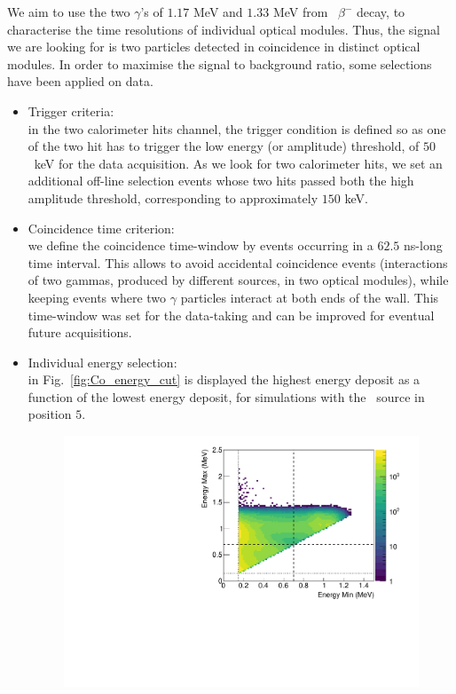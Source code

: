 We aim to use the two $\gamma$'s of $1.17$ MeV and $1.33$ MeV from \Co\ $\beta^{-}$ decay, to characterise the time resolutions of individual optical modules.
Thus, the signal we are looking for is two particles detected in coincidence in distinct optical modules.
In order to maximise the signal to background ratio, some selections have been applied on data.
\begin{itemize}
\item Trigger criteria:\\ in the two calorimeter hits channel, the trigger condition is defined so as one of the two hit has to trigger the low energy (or amplitude) threshold, of $50$~keV for the data acquisition.
  As we look for two calorimeter hits, we set an additional off-line selection events whose two hits passed both the high amplitude threshold, corresponding to approximately $150$ keV.
\item Coincidence time criterion:\\ we define the coincidence time-window by events occurring in a $62.5$ ns-long time interval.
  This allows to avoid accidental coincidence events (interactions of two gammas, produced by different sources, in two optical modules), while keeping events where two $\gamma$ particles interact at both ends of the wall.
  This time-window was set for the data-taking and can be improved for eventual future acquisitions.
\item Individual energy selection:\\ in Fig.~\ref{fig:Co_energy_cut} is displayed the highest energy deposit as a function of the lowest energy deposit, for simulations with the \Co\ source in position $5$.
  \begin{figure}[h]
    \centering
    \includegraphics[width=14cm]{commissioning/fig_commissioning/Co_energy_cut.pdf}

\end{figure}
\end{itemize}
